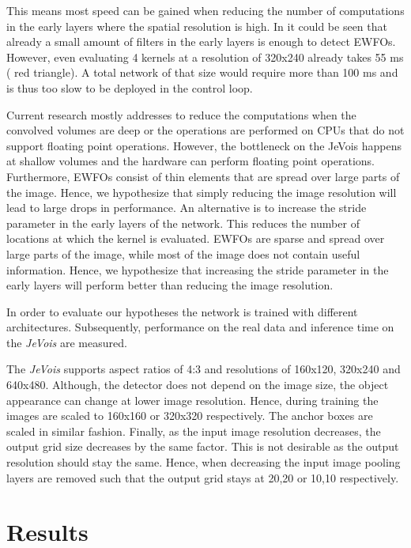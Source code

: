 This means most speed can be gained when reducing the number of computations in the early layers where the spatial resolution is high. In  it could be seen that already a small amount of filters in the early layers is enough to detect \acp{EWFO}. However, even evaluating 4 kernels at a resolution of 320x240 already takes 55 ms ( red triangle). A total network of that size would require more than 100 ms and is thus too slow to be deployed in the control loop.

Current research mostly addresses to reduce the computations when the convolved volumes are deep or the operations are performed on \acp{CPU} that do not support floating point operations. However, the bottleneck on the JeVois happens at shallow volumes and the hardware can perform floating point operations. Furthermore, \acp{EWFO} consist of thin elements that are spread over large parts of the image. Hence, we hypothesize that simply reducing the image resolution will lead to large drops in performance. An alternative is to increase the stride parameter in the early layers of the network. This reduces the number of locations at which the kernel is evaluated. \acp{EWFO} are sparse and spread over large parts of the image, while most of the image does not contain useful information. Hence, we hypothesize that increasing the stride parameter in the early layers will perform better than reducing the image resolution.

In order to evaluate our hypotheses the network is trained with different architectures. Subsequently, performance on the real data and inference time on the \textit{JeVois} are measured.

The \textit{JeVois} supports aspect ratios of 4:3 and resolutions of 160x120, 320x240 and 640x480. Although, the detector does not depend on the image size, the object appearance can change at lower image resolution. Hence, during training the images are scaled to 160x160 or 320x320 respectively. The anchor boxes are scaled in similar fashion. Finally, as the input image resolution decreases, the output grid size decreases by the same factor. This is not desirable as the output resolution should stay the same. Hence, when decreasing the input image pooling layers are removed such that the output grid stays at 20,20 or 10,10 respectively.

\section{Results}

